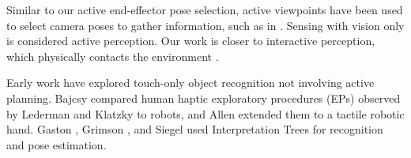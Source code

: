 \documentclass[letterpaper, 10 pt, conference]{ieeeconf}  %
\begin{document}
Similar to our active end-effector pose selection, active viewpoints have been used to select camera poses to gather information, such as in \cite{doumanoglou2016}.
Sensing with vision only is considered active perception. Our work is closer to interactive perception, which physically contacts the environment \cite{bohg2016}.



Early work have explored touch-only object recognition not involving active planning.
Bajcsy \cite{bajcsy1987} compared human haptic exploratory procedures (EPs) observed by Lederman and Klatzky \cite{lederman1987} to robots, and Allen \cite{allen1990} extended them to a tactile robotic hand.
Gaston \cite{gaston1984}, Grimson \cite{grimson1984}, and Siegel \cite{siegel1991} used Interpretation Trees for recognition and pose estimation.


\end{document}
